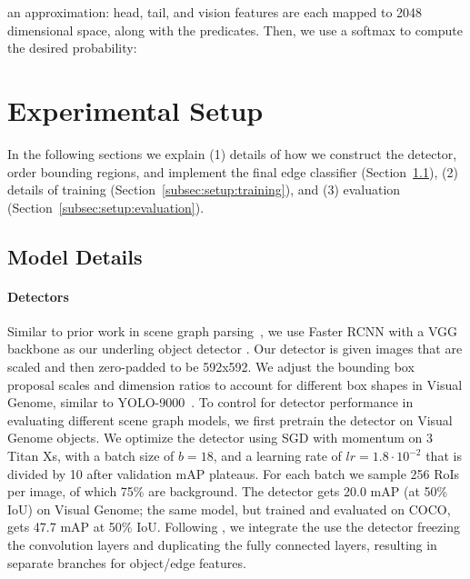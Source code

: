 \documentclass[10pt,twocolumn,letterpaper]{article}
\newcommand{\authcomment}[3]{\textcolor{#1}{#2:[#3]}}
\newcommand{\sam}[1]{\authcomment{blue}{sam}{#1}}
\begin{document}
an approximation: head, tail, and vision features are each mapped to 2048 dimensional space, along with the predicates. Then, we use a softmax to compute the desired probability:%
\section{Experimental Setup}
\label{sec:setup}
In the following sections we explain (1) details of how we construct the detector, order bounding regions, and implement the final edge classifier (Section~\ref{subsec:setup:model_details}), (2) details of training (Section~\ref{subsec:setup:training}), and (3) evaluation (Section~\ref{subsec:setup:evaluation}).

\subsection{Model Details}\label{subsec:setup:model_details}\paragraph{Detectors}
Similar to prior work in scene graph parsing~\cite{xu_scene_2017, li2017msdn}, we use Faster RCNN with a VGG backbone as our underling object detector \cite{ren_faster_2015,Simonyan14c}. Our detector is given images that are scaled and then zero-padded to be 592x592. We adjust the bounding box proposal scales and dimension ratios to account for different box shapes in Visual Genome, similar to YOLO-9000~\cite{redmon_yolo9000:_2016}. To control for detector performance in evaluating different scene graph models, we first pretrain the detector on Visual Genome objects. We optimize the detector using SGD with momentum on 3 Titan Xs, with a batch size of $b=18$, and a learning rate of $lr=1.8\cdot 10^{-2}$ that is divided by 10 after validation mAP plateaus.
For each batch we sample 256 RoIs per image, of which 75\% are background. The detector gets 20.0 mAP (at 50\% IoU) on Visual Genome; the same model, but trained and evaluated on COCO, gets 47.7 mAP at 50\% IoU. Following \cite{xu_scene_2017}, we integrate the use the detector freezing the convolution layers and duplicating the fully connected layers, resulting in separate branches for object/edge features.
\end{document}
